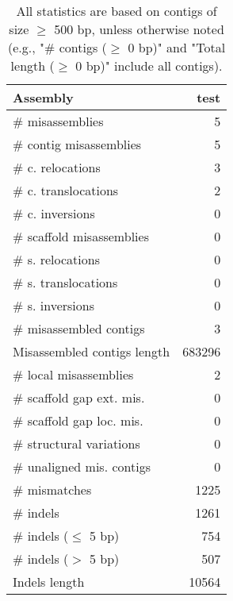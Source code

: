 \documentclass[12pt,a4paper]{article}
\begin{document}
\begin{table}[ht]
\begin{center}
\caption{All statistics are based on contigs of size $\geq$ 500 bp, unless otherwise noted (e.g., "\# contigs ($\geq$ 0 bp)" and "Total length ($\geq$ 0 bp)" include all contigs).}
\begin{tabular}{|l*{1}{|r}|}
\hline
Assembly & test \\ \hline
\# misassemblies & 5 \\ \hline
\hspace{2mm}\# contig misassemblies & 5 \\ \hline
\hspace{5mm}\# c. relocations & 3 \\ \hline
\hspace{5mm}\# c. translocations & 2 \\ \hline
\hspace{5mm}\# c. inversions & 0 \\ \hline
\hspace{2mm}\# scaffold misassemblies & 0 \\ \hline
\hspace{5mm}\# s. relocations & 0 \\ \hline
\hspace{5mm}\# s. translocations & 0 \\ \hline
\hspace{5mm}\# s. inversions & 0 \\ \hline
\# misassembled contigs & 3 \\ \hline
Misassembled contigs length & 683296 \\ \hline
\# local misassemblies & 2 \\ \hline
\# scaffold gap ext. mis. & 0 \\ \hline
\# scaffold gap loc. mis. & 0 \\ \hline
\# structural variations & 0 \\ \hline
\# unaligned mis. contigs & 0 \\ \hline
\# mismatches & 1225 \\ \hline
\# indels & 1261 \\ \hline
\hspace{5mm}\# indels ($\leq$ 5 bp) & 754 \\ \hline
\hspace{5mm}\# indels ($>$ 5 bp) & 507 \\ \hline
Indels length & 10564 \\ \hline
\end{tabular}
\end{center}
\end{table}
\end{document}
